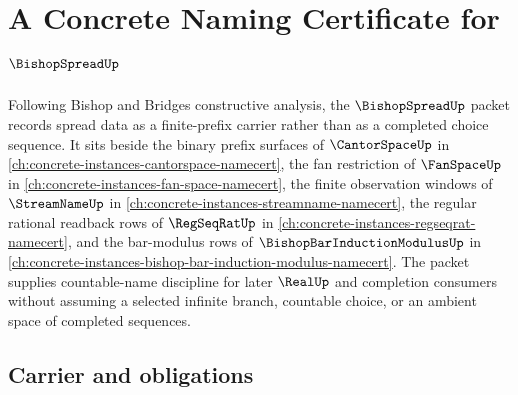 \chapter{A Concrete Naming Certificate for $\BishopSpreadUp$}
\label{ch:concrete-instances-bishop-spread-namecert}

Following Bishop and Bridges constructive analysis, the $\BishopSpreadUp$ packet records spread data as a finite-prefix carrier rather than as a completed choice sequence. It sits beside the binary prefix surfaces of $\CantorSpaceUp$ in \autoref{ch:concrete-instances-cantorspace-namecert}, the fan restriction of $\FanSpaceUp$ in \autoref{ch:concrete-instances-fan-space-namecert}, the finite observation windows of $\StreamNameUp$ in \autoref{ch:concrete-instances-streamname-namecert}, the regular rational readback rows of $\RegSeqRatUp$ in \autoref{ch:concrete-instances-regseqrat-namecert}, and the bar-modulus rows of $\BishopBarInductionModulusUp$ in \autoref{ch:concrete-instances-bishop-bar-induction-modulus-namecert}. The packet supplies countable-name discipline for later $\RealUp$ and completion consumers without assuming a selected infinite branch, countable choice, or an ambient space of completed sequences.

\section{Carrier and obligations}
\label{sec:bishop-spread-carrier}

